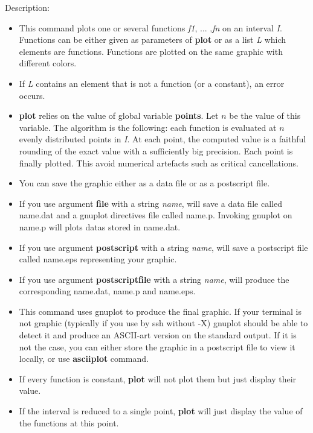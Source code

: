 \noindent Description: \begin{itemize}

\item This command plots one or several functions \emph{f1}, ... ,\emph{fn} on an interval \emph{I}.
   Functions can be either given as parameters of \textbf{plot} or as a list \emph{L}
   which elements are functions.
   Functions are plotted on the same graphic with different colors.

\item If \emph{L} contains an element that is not a function (or a constant), an error
   occurs.

\item \textbf{plot} relies on the value of global variable \textbf{points}. Let $n$ be the 
   value of this variable. The algorithm is the following: each function is 
   evaluated at $n$ evenly distributed points in \emph{I}. At each point, the 
   computed value is a faithful rounding of the exact value with a sufficiently
   big precision. Each point is finally plotted.
   This avoid numerical artefacts such as critical cancellations.

\item You can save the graphic either as a data file or as a postscript file.

\item If you use argument \textbf{file} with a string \emph{name}, \sollya will save a data file
   called name.dat and a gnuplot directives file called name.p. Invoking gnuplot
   on name.p will plots datas stored in name.dat.

\item If you use argument \textbf{postscript} with a string \emph{name}, \sollya will save a 
   postscript file called name.eps representing your graphic.

\item If you use argument \textbf{postscriptfile} with a string \emph{name}, \sollya will 
   produce the corresponding name.dat, name.p and name.eps.

\item This command uses gnuplot to produce the final graphic.
   If your terminal is not graphic (typically if you use \sollya by 
   ssh without -X)
   gnuplot should be able to detect it and produce an ASCII-art version on the
   standard output. If it is not the case, you can either store the graphic in a
   postscript file to view it locally, or use \textbf{asciiplot} command.

\item If every function is constant, \textbf{plot} will not plot them but just display
   their value.

\item If the interval is reduced to a single point, \textbf{plot} will just display the
   value of the functions at this point.
\end{itemize}

